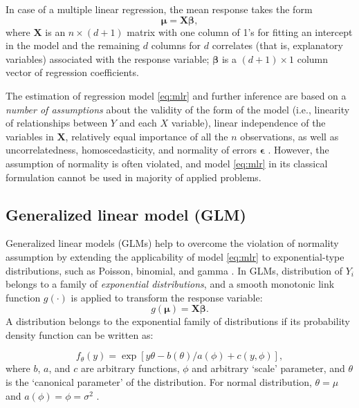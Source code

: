 \documentclass[
]{book}
\begin{document}
In case of a multiple linear regression, the mean response takes the form
\begin{equation}
    \label{eq:mlr}
    \boldsymbol{\mu} = \mathbf{X}\boldsymbol{\beta},
\end{equation}
where \(\mathbf{X}\) is an \(n\times(d+1)\) matrix with one column of 1's for fitting an intercept in the model and the remaining \(d\) columns for \(d\) correlates (that is, explanatory variables) associated with the response variable; \(\boldsymbol{\beta}\) is a \((d+1)\times 1\) column vector of regression coefficients.

The estimation of regression model \eqref{eq:mlr} and further inference are based on a \emph{number of assumptions} about the validity of the form of the model (i.e., linearity of relationships between \(Y\) and each \(X\) variable), linear independence of the variables in \(\mathbf{X}\), relatively equal importance of all the \(n\) observations, as well as uncorrelatedness, homoscedasticity, and normality of errors \(\boldsymbol{\epsilon}\) \citep{Chatterjee:Hadi:2006}. However, the assumption of normality is often violated, and model \eqref{eq:mlr} in its classical formulation cannot be used in majority of applied problems.

\hypertarget{generalized-linear-model-glm}{%
\subsection{Generalized linear model (GLM)}\label{generalized-linear-model-glm}}

Generalized linear models (GLMs) help to overcome the violation of normality assumption by extending the applicability of model \eqref{eq:mlr} to exponential-type distributions, such as Poisson, binomial, and gamma \citep{Wood:2006book}. In GLMs, distribution of \(Y_i\) belongs to a family of \emph{exponential distributions}, and a smooth monotonic link function \(g(\cdot)\) is applied to transform the response variable:
\begin{equation}
    \label{eq:glm}
    g(\boldsymbol{\mu}) = \mathbf{X}\boldsymbol{\beta}.
\end{equation}
A distribution belongs to the exponential family of distributions if its probability density function can be written as:

\[f_{\theta}(y) = \exp[{y\theta - b(\theta)}/a(\phi) + c(y, \phi)],\]
where \(b\), \(a\), and \(c\) are arbitrary functions, \(\phi\) and arbitrary `scale' parameter, and \(\theta\) is the `canonical parameter' of the distribution. For normal distribution, \(\theta = \mu\) and \(a(\phi) = \phi= \sigma^2\) \citep{Wood:2006book}.
\end{document}
